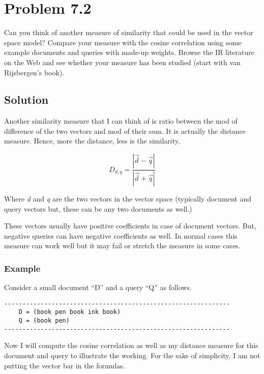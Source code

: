 \documentclass[letterpaper,12pt]{article}
\begin{document}
\pagebreak


\section{Problem 7.2}

Can you think of another measure of similarity that could be used in the vector space model? Compare your measure with the cosine correlation using some example documents and queries with made-up weights. Browse the IR literature on the Web and see whether your measure has been studied (start with van Rijsbergen's book).

\subsection{Solution}

Another similarity measure that I can think of is ratio between the mod of difference of the two vectors and mod of their sum. It is actually the distance measure. Hence, more the distance, less is the similarity.

$$ D_{d, q} = \frac{|\vec{d} - \vec{q}|}{|\vec{d} + \vec{q}|} $$

Where \emph{d} and \emph{q} are the two vectors in the vector space (typically document and query vectors but, these can be any two documents as well.)

These vectors usually have positive coefficients in case of document vectors. But, negative queries can have negative coefficients as well. In normal cases this measure can work well but it may fail or stretch the measure in some cases.

\subsubsection{Example}

Consider a small document ``D'' and a query ``Q'' as follows.

\begin{verbatim}
--------------------------------------------------------------
    D = (book pen book ink book)
    Q = (book pen)
--------------------------------------------------------------
\end{verbatim}

Now I will compute the cosine correlation as well as my distance measure for this document and query to illustrate the working. For the sake of simplicity, I am not putting the vector bar in the formulas.
\end{document}
